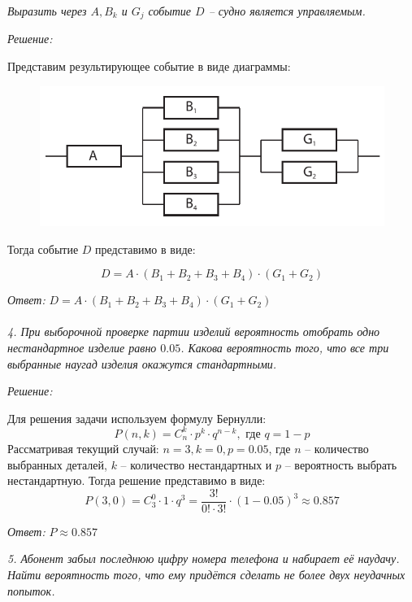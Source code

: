 \emph{Выразить через \( A, B_k \) и \( G_j \) событие \( D \) -- судно является 
управляемым.}

\emph{Решение:}

Представим результирующее событие в виде диаграммы:

\begin{figure}[h!]
        \center
        \includegraphics[width=.6\textwidth]{graph}
\end{figure}

Тогда событие \( D \) представимо в виде:

\[ 
	D = A\cdot\left( B_1 + B_2 + B_3 + B_4 \right)\cdot\left( G_1 + G_2 \right) 
\]

\emph{Ответ: } 
\(
	D = A\cdot\left( B_1 + B_2 + B_3 + B_4 \right)\cdot\left( G_1 + G_2 \right) 
\) \\\\


\emph{4. При выборочной проверке партии изделий вероятность отобрать одно 
нестандартное изделие равно \( 0.05 \). Какова вероятность того, что все 
три выбранные наугад изделия окажутся стандартными.}

\emph{Решение:}

Для решения задачи используем формулу Бернулли:
\[ 
	P(n, k) = C^{k}_{n} \cdot p^k \cdot q^{n-k}, \text{ где } q = 1 - p 
\]
Рассматривая текущий случай: \( n = 3, k = 0, p = 0.05 \), где 
\( n \) -- количество выбранных деталей, \( k \) -- количество 
нестандартных и \( p \) -- вероятность выбрать нестандартную. 
Тогда решение представимо в виде:
\[ 
	P(3, 0) = C^{0}_{3} \cdot 1 \cdot q^{3} = 
	\frac{ 3! }{ 0! \cdot 3! } \cdot (1 - 0.05)^3 \approx 0.857
\]

\emph{Ответ: } \( P \approx 0.857 \)

\newpage


\emph{5. Абонент забыл последнюю цифру номера телефона и набирает её 
наудачу. Найти вероятность того, что ему придётся сделать не более двух 
неудачных попыток.}

